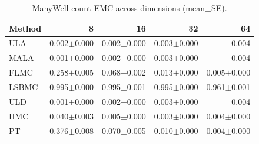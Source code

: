 \begin{table}[t]
\centering
\small
\caption{ManyWell count-EMC across dimensions (mean$\pm$SE).}
\label{tab:manywell_countemc_scaling}
\begin{tabular}{lrrrr}
\toprule
Method & 8 & 16 & 32 & 64 \\
\midrule
ULA & 0.002$\pm$0.000 & 0.002$\pm$0.000 & 0.003$\pm$0.000 & 0.004 \\
MALA & 0.001$\pm$0.000 & 0.002$\pm$0.000 & 0.003$\pm$0.000 & 0.004 \\
FLMC & 0.258$\pm$0.005 & 0.068$\pm$0.002 & 0.013$\pm$0.000 & 0.005$\pm$0.000 \\
LSBMC & 0.995$\pm$0.000 & 0.995$\pm$0.001 & 0.995$\pm$0.000 & 0.961$\pm$0.001 \\
ULD & 0.001$\pm$0.000 & 0.002$\pm$0.000 & 0.003$\pm$0.000 & 0.004 \\
HMC & 0.040$\pm$0.003 & 0.005$\pm$0.000 & 0.003$\pm$0.000 & 0.004$\pm$0.000 \\
PT & 0.376$\pm$0.008 & 0.070$\pm$0.005 & 0.010$\pm$0.000 & 0.004$\pm$0.000 \\
\bottomrule
\end{tabular}
\end{table}